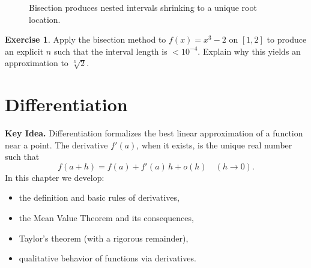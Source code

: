 \documentclass[12pt]{article}
\numberwithin{equation}{section}
\theoremstyle{plain}
\theoremstyle{definition}
\newtheorem{exercise}[theorem]{Exercise}
\theoremstyle{remark}
\newenvironment{keyidea}{\begin{tcolorbox}\textbf{Key Idea.}}{\end{tcolorbox}}
\begin{document}
\begin{figure}[H]
\centering
\caption{Bisection produces nested intervals shrinking to a unique root location.}
\end{figure}

\begin{exercise}
Apply the bisection method to $f(x)=x^3-2$ on $[1,2]$ to produce an explicit $n$ such that the interval length is $<10^{-4}$.
Explain why this yields an approximation to $\sqrt[3]{2}$.
\end{exercise}

\newpage


\section{Differentiation}

\begin{keyidea}
Differentiation formalizes the best linear approximation of a function near a point.
The derivative $f'(a)$, when it exists, is the unique real number such that
\[
f(a+h)=f(a)+f'(a)\,h + o(h)\quad (h\to 0).
\]
In this chapter we develop:
\begin{itemize}
\item the definition and basic rules of derivatives,
\item the Mean Value Theorem and its consequences,
\item Taylor's theorem (with a rigorous remainder),
\item qualitative behavior of functions via derivatives.
\end{itemize}
\end{keyidea}
\end{document}
